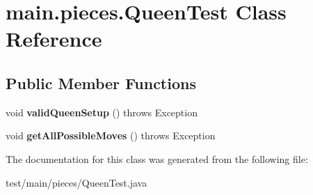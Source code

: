 \hypertarget{classmain_1_1pieces_1_1_queen_test}{}\section{main.\+pieces.\+Queen\+Test Class Reference}
\label{classmain_1_1pieces_1_1_queen_test}
\subsection*{Public Member Functions}
\begin{DoxyCompactItemize}
\item 
\mbox{\label{classmain_1_1pieces_1_1_queen_test_a9ae056fe69b2ce4bbbd3c5c98a39e509}} 
void {\bfseries valid\+Queen\+Setup} ()  throws Exception 
\item 
\mbox{\label{classmain_1_1pieces_1_1_queen_test_a0afa3443c6d12502cd8d0a266b034a7f}} 
void {\bfseries get\+All\+Possible\+Moves} ()  throws Exception 
\end{DoxyCompactItemize}


The documentation for this class was generated from the following file\+:\begin{DoxyCompactItemize}
\item 
test/main/pieces/Queen\+Test.\+java\end{DoxyCompactItemize}
